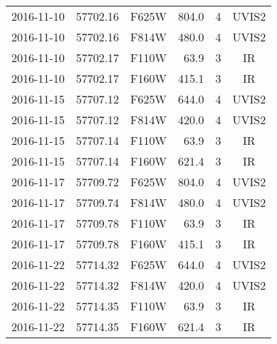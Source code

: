 \begin{tabular}{crcrcc}
2016-11-10 & 57702.16 & F625W & 804.0 & 4 & UVIS2 \\
2016-11-10 & 57702.16 & F814W & 480.0 & 4 & UVIS2 \\
2016-11-10 & 57702.17 & F110W & 63.9 & 3 & IR \\
2016-11-10 & 57702.17 & F160W & 415.1 & 3 & IR \\
2016-11-15 & 57707.12 & F625W & 644.0 & 4 & UVIS2 \\
2016-11-15 & 57707.12 & F814W & 420.0 & 4 & UVIS2 \\
2016-11-15 & 57707.14 & F110W & 63.9 & 3 & IR \\
2016-11-15 & 57707.14 & F160W & 621.4 & 3 & IR \\
2016-11-17 & 57709.72 & F625W & 804.0 & 4 & UVIS2 \\
2016-11-17 & 57709.74 & F814W & 480.0 & 4 & UVIS2 \\
2016-11-17 & 57709.78 & F110W & 63.9 & 3 & IR \\
2016-11-17 & 57709.78 & F160W & 415.1 & 3 & IR \\
2016-11-22 & 57714.32 & F625W & 644.0 & 4 & UVIS2 \\
2016-11-22 & 57714.32 & F814W & 420.0 & 4 & UVIS2 \\
2016-11-22 & 57714.35 & F110W & 63.9 & 3 & IR \\
2016-11-22 & 57714.35 & F160W & 621.4 & 3 & IR \\
\hline\hline
\end{tabular}
